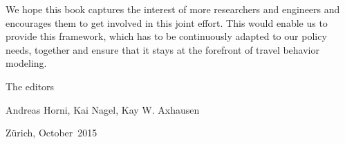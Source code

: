We hope this book captures the interest of more researchers and engineers and encourages them to get involved in this joint effort. This would enable us to provide this \gls{framework}, which has to be continuously adapted to our policy needs, together and ensure that it stays at the forefront of travel behavior modeling.

The editors

Andreas Horni, 	Kai Nagel,	Kay W. Axhausen


Zürich, October~2015

%

